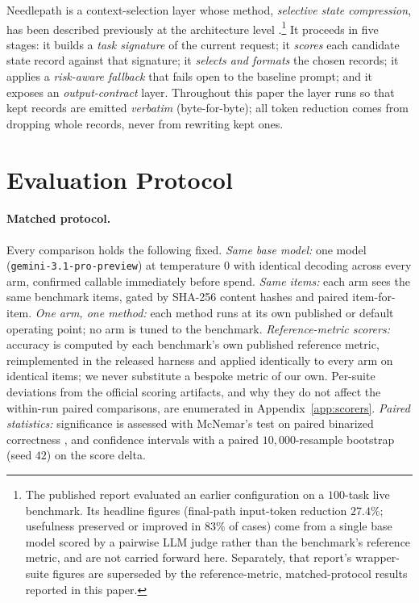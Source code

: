 \documentclass[11pt]{article}
\newcommand{\NP}{Needlepath}
\begin{document}
\NP{} is a context-selection layer whose method, \emph{selective state compression}, has been
described previously at the architecture level \citep{rao2026needlepath}.\footnote{The published
report \citep{rao2026needlepath} evaluated an earlier configuration on a
$100$-task live benchmark. Its headline figures (final-path input-token reduction $27.4\%$;
usefulness preserved or improved in $83\%$ of cases) come from a single base model scored by a
pairwise LLM judge rather than the benchmark's reference metric, and are not carried
forward here. Separately, that report's wrapper-suite figures are superseded by the
reference-metric, matched-protocol results reported in this paper.} It proceeds in five stages: it
builds a \emph{task signature} of the current request; it \emph{scores} each candidate state
record against that signature; it \emph{selects and formats} the chosen records; it applies a
\emph{risk-aware fallback} that fails open to the baseline prompt; and it exposes an
\emph{output-contract} layer. Throughout this paper the layer runs so that kept records are
emitted \emph{verbatim} (byte-for-byte); all token reduction comes from dropping whole records,
never from rewriting kept ones.

\section{Evaluation Protocol}
\label{sec:protocol}

\paragraph{Matched protocol.} Every comparison holds the following fixed. \emph{Same base model:}
one model (\texttt{gemini-3.1-pro-preview}) at temperature $0$ with identical decoding across
every arm, confirmed callable immediately before spend. \emph{Same items:} each arm sees the
same benchmark items, gated by SHA-256 content hashes and paired item-for-item. \emph{One arm,
one method:} each method runs at its own published or default operating point; no arm is tuned to
the benchmark. \emph{Reference-metric scorers:} accuracy is computed by each benchmark's own
published reference metric, reimplemented in the released harness and applied
identically to every arm on identical items; we never substitute a bespoke metric
of our own. Per-suite deviations from the official scoring artifacts, and why they
do not affect the within-run paired comparisons, are enumerated in
Appendix~\ref{app:scorers}. \emph{Paired statistics:} significance is assessed with McNemar's
test on paired binarized correctness \citep{mcnemar1947}, and confidence intervals with a paired
$10{,}000$-resample bootstrap (seed $42$) on the score delta.
\end{document}
